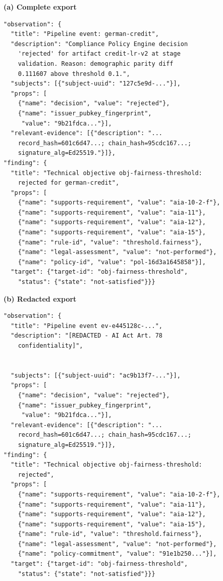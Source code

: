 \begin{minipage}[t]{0.49\textwidth}
\centering\textbf{\footnotesize (a) Complete export}
\begin{lstlisting}[style=json]
"observation": {
  "title": "Pipeline event: german-credit",
  "description": "Compliance Policy Engine decision
    'rejected' for artifact credit-lr-v2 at stage
    validation. Reason: demographic parity diff
    0.111607 above threshold 0.1.",
  "subjects": [{"subject-uuid": "127c5e9d-..."}],
  "props": [
    {"name": "decision", "value": "rejected"},
    {"name": "issuer_pubkey_fingerprint",
     "value": "9b21fdca..."}],
  "relevant-evidence": [{"description": "...
    record_hash=601c6d47...; chain_hash=95cdc167...;
    signature_alg=Ed25519."}]},
"finding": {
  "title": "Technical objective obj-fairness-threshold:
    rejected for german-credit",
  "props": [
    {"name": "supports-requirement", "value": "aia-10-2-f"},
    {"name": "supports-requirement", "value": "aia-11"},
    {"name": "supports-requirement", "value": "aia-12"},
    {"name": "supports-requirement", "value": "aia-15"},
    {"name": "rule-id", "value": "threshold.fairness"},
    {"name": "legal-assessment", "value": "not-performed"},
    {"name": "policy-id", "value": "pol-16d3a1645858"}],
  "target": {"target-id": "obj-fairness-threshold",
    "status": {"state": "not-satisfied"}}}
\end{lstlisting}
\end{minipage}\hfill
\begin{minipage}[t]{0.49\textwidth}
\centering\textbf{\footnotesize (b) Redacted export}
\begin{lstlisting}[style=json]
"observation": {
  "title": "Pipeline event ev-e445128c-...",
  "description": "[REDACTED - AI Act Art. 78
    confidentiality]",


  "subjects": [{"subject-uuid": "ac9b13f7-..."}],
  "props": [
    {"name": "decision", "value": "rejected"},
    {"name": "issuer_pubkey_fingerprint",
     "value": "9b21fdca..."}],
  "relevant-evidence": [{"description": "...
    record_hash=601c6d47...; chain_hash=95cdc167...;
    signature_alg=Ed25519."}]},
"finding": {
  "title": "Technical objective obj-fairness-threshold:
    rejected",
  "props": [
    {"name": "supports-requirement", "value": "aia-10-2-f"},
    {"name": "supports-requirement", "value": "aia-11"},
    {"name": "supports-requirement", "value": "aia-12"},
    {"name": "supports-requirement", "value": "aia-15"},
    {"name": "rule-id", "value": "threshold.fairness"},
    {"name": "legal-assessment", "value": "not-performed"},
    {"name": "policy-commitment", "value": "91e1b250..."}],
  "target": {"target-id": "obj-fairness-threshold",
    "status": {"state": "not-satisfied"}}}
\end{lstlisting}
\end{minipage}
